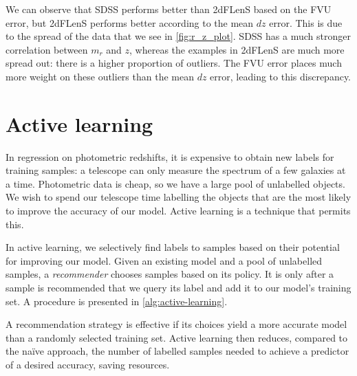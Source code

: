 \documentclass[11pt,twoside,openright]{report}
\begin{document}
We can observe that SDSS performs better than 2dFLenS based on the FVU error, but 2dFLenS performs better according to the mean $dz$ error. This is due to the spread of the data that we see in \cref{fig:r_z_plot}. SDSS has a much stronger correlation between $m_r$ and $z$, whereas the examples in 2dFLenS are much more spread out: there is a higher proportion of outliers. The FVU error places much more weight on these outliers than the mean $dz$ error, leading to this discrepancy.

\chapter{Active learning}
\label{sec:active-learning}

In regression on photometric redshifts, it is expensive to obtain new labels for training samples: a telescope can only measure the spectrum of a few galaxies at a time. Photometric data is cheap, so we have a large pool of unlabelled objects. We wish to spend our telescope time labelling the objects that are the most likely to improve the accuracy of our model. Active learning is a technique that permits this.

In active learning, we selectively find labels to samples based on their potential for improving our model. Given an existing model and a pool of unlabelled samples, a \textit{recommender} chooses samples based on its policy. It is only after a sample is recommended that we query its label and add it to our model's training set. A procedure is presented in \cref{alg:active-learning}.

A recommendation strategy is effective if its choices yield a more accurate model than a randomly selected training set. Active learning then reduces, compared to the naïve approach, the number of labelled samples needed to achieve a predictor of a desired accuracy, saving resources.
\end{document}
